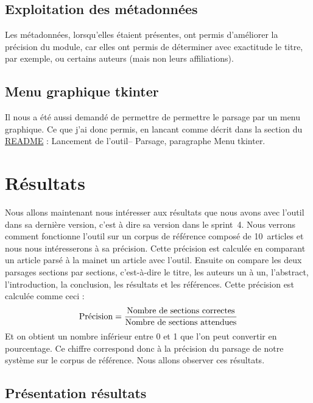 \documentclass{article}
\begin{document}
\subsection{Exploitation des métadonnées}
Les métadonnées, lorsqu'elles étaient présentes, ont permis d'améliorer la précision du module, car elles ont permis de déterminer avec exactitude le titre, par exemple, ou certains auteurs (mais non leurs affiliations).

\subsection{Menu graphique tkinter}
Il nous a été aussi demandé de permettre de permettre le parsage par un \og menu graphique\fg. Ce que j'ai donc permis, en lancant comme décrit dans la section du \textcolor{blue}{\href{https://github.com/TheauH/Parser-IRISA/blob/sprint5/README.md}{README}} : \og Lancement de l'outil\fg -- \og Parsage\fg, paragraphe \og Menu tkinter\fg.

\section{Résultats}
Nous allons maintenant nous intéresser aux résultats que nous avons avec l'outil dans sa dernière version, c'est à dire sa version dans le sprint~4. Nous verrons comment fonctionne l'outil sur un corpus de référence composé de 10~articles et nous nous intéresserons à sa précision. Cette précision est calculée en comparant un article parsé \og à la main\fg et un article avec l'outil. Ensuite on compare les deux parsages sections par sections, c'est-à-dire le titre, les auteurs un à un, l'abstract, l'introduction, la conclusion, les résultats et les références. Cette précision est calculée comme ceci :
\[
\mathrm{Pr\acute ecision} = {\mathrm{Nombre\ de\ sections\ correctes} \over \mathrm{Nombre\ de\ sections\ attendues}}
\]
Et on obtient un nombre inférieur entre 0 et 1 que l'on peut convertir en pourcentage. Ce chiffre correspond donc à la précision du parsage de notre système sur le corpus de référence. Nous allons  observer ces résultats.

\subsection{Présentation résultats}
\end{document}
